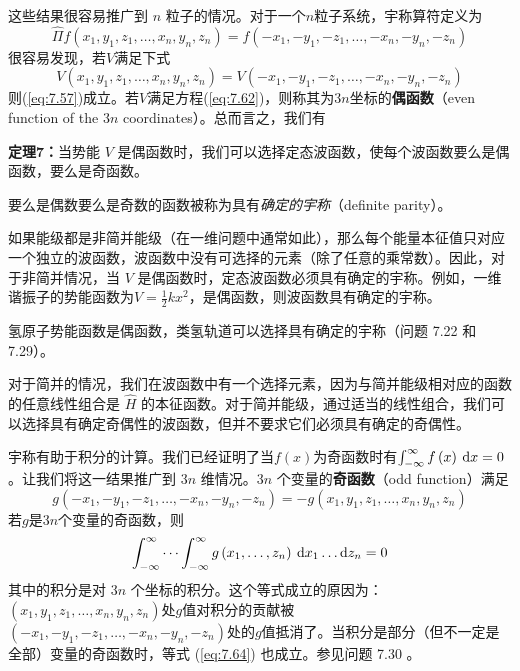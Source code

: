     这些结果很容易推广到 $n$ 粒子的情况。对于一个$n$粒子系统，宇称算符定义为
    \begin{equation}
        \hat{\Pi}f\left(x_1,y_1,z_1,\ldots,x_n,y_n,z_n\right) = f\left(-x_1,-y_1,-z_1,\ldots,-x_n,-y_n,-z_n\right)
        \label{eq:7.61}
    \end{equation}
    很容易发现，若$V$满足下式
    \begin{equation}
        V\left(x_1,y_1,z_1,\ldots,x_n,y_n,z_n\right) = V\left(-x_1,-y_1,-z_1,\ldots,-x_n,-y_n,-z_n\right)
        \label{eq:7.62}
    \end{equation}
    则(\ref{eq:7.57})成立。若$V$满足方程(\ref{eq:7.62})，则称其为$3n$坐标的\textbf{偶函数}（even function of the $3n$ coordinates）。总而言之，我们有
    \begin{center}
        \parbox{0.8\textwidth}{
            \textbf{定理7：}当势能 $V$ 是偶函数时，我们可以选择定态波函数，使每个波函数要么是偶函数，要么是奇函数。
        }
    \end{center}

    要么是偶数要么是奇数的函数被称为具有\textit{确定的宇称}（definite parity）。

    如果能级都是非简并能级（在一维问题中通常如此），那么每个能量本征值只对应一个独立的波函数，波函数中没有可选择的元素（除了任意的乘常数）。因此，对于非简并情况，当 $V$ 是偶函数时，定态波函数必须具有确定的宇称。例如，一维谐振子的势能函数为$V = \frac{1}{2}kx^2$，是偶函数，则波函数具有确定的宇称。

    氢原子势能函数是偶函数，类氢轨道可以选择具有确定的宇称（问题 7.22 和 7.29）。

    对于简并的情况，我们在波函数中有一个选择元素，因为与简并能级相对应的函数的任意线性组合是 $\hat{H}$ 的本征函数。对于简并能级，通过适当的线性组合，我们可以选择具有确定奇偶性的波函数，但并不要求它们必须具有确定的奇偶性。

    宇称有助于积分的计算。我们已经证明了当$f\left(x\right)$为奇函数时有$\int_{-\infty}^{\infty} f\left(x\right)\:\dd x = 0$。让我们将这一结果推广到 $3n$ 维情况。$3n$ 个变量的\textbf{奇函数}（odd function）满足
    \begin{equation}
        g\left(-x_1,-y_1,-z_1,\ldots,-x_n,-y_n,-z_n\right) = -g\left(x_1,y_1,z_1,\ldots,x_n,y_n,z_n\right)
        \label{eq:7.63}
    \end{equation}
    若$g$是$3n$个变量的奇函数，则
    \begin{equation}
        \int_{-\infty}^{\infty} \cdots\int_{-\infty}^{\infty} g\left(x_1,\ldots,z_n\right)\:\dd x_1\ldots\dd z_n = 0
        \label{eq:7.64}
    \end{equation}
    其中的积分是对 $3n$ 个坐标的积分。这个等式成立的原因为：$\left(x_1,y_1,z_1,\ldots,x_n,y_n,z_n\right)$处$g$值对积分的贡献被$\left(-x_1,-y_1,-z_1,\ldots,-x_n,-y_n,-z_n\right)$处的$g$值抵消了。当积分是部分（但不一定是全部）变量的奇函数时，等式 (\ref{eq:7.64}) 也成立。参见问题 7.30 。

